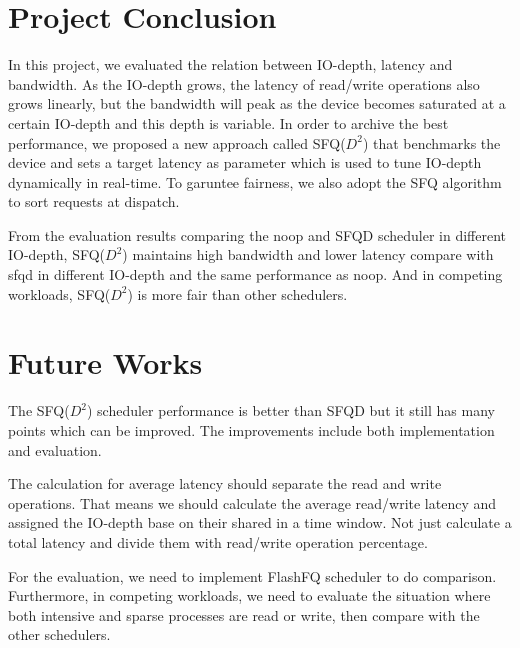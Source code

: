 \section{Project Conclusion}

In this project, we evaluated the relation between IO-depth, latency
and bandwidth.  As the IO-depth grows, the latency of read/write
operations also grows linearly, but the bandwidth will peak as the
device becomes saturated at a certain IO-depth and this depth is
variable. In order to archive the best performance, we proposed a new
approach called SFQ($D^2$) that benchmarks the device and sets a
target latency as parameter which is used to tune IO-depth dynamically
in real-time. To garuntee fairness, we also adopt the SFQ algorithm to
sort requests at dispatch.

From the evaluation results comparing the noop and SFQD scheduler in
different IO-depth, SFQ($D^2$) maintains high bandwidth and lower
latency compare with sfqd in different IO-depth and the same
performance as noop. And in competing workloads, SFQ($D^2$) is more
fair than other schedulers.

\section{Future Works}

The SFQ($D^2$) scheduler performance is better than SFQD but it still
has many points which can be improved. The improvements include both
implementation and evaluation.

The calculation for average latency should separate the read and write
operations. That means we should calculate the average read/write
latency and assigned the IO-depth base on their shared in a time
window.  Not just calculate a total latency and divide them with
read/write operation percentage.

For the evaluation, we need to implement FlashFQ scheduler to do
comparison. Furthermore, in competing workloads, we need to evaluate
the situation where both intensive and sparse processes are read or
write, then compare with the other schedulers.
